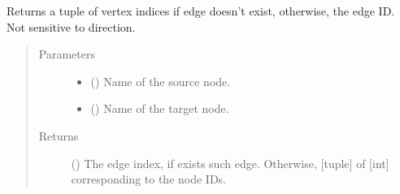 \documentclass[letterpaper,10pt,english]{sphinxmanual}
\begin{document}
\begin{fulllineitems}
\begin{fulllineitems}
\end{fulllineitems}


\begin{fulllineitems}
\label{\detokenize{main:pypath.main.PyPath.dvs}}
\end{fulllineitems}


\begin{fulllineitems}
\label{\detokenize{main:pypath.main.PyPath.edge_exists}}
Returns a tuple of vertex indices if edge doesn’t exist,
otherwise, the edge ID. Not sensitive to direction.
\begin{quote}\begin{description}
\item[{Parameters}] \leavevmode\begin{itemize}
\item {} 
 () \textendash{} Name of the source node.

\item {} 
 () \textendash{} Name of the target node.

\end{itemize}

\item[{Returns}] \leavevmode
() \textendash{} The edge index, if exists such edge. Otherwise,
{[}tuple{]} of {[}int{]} corresponding to the node IDs.

\end{description}\end{quote}

\end{fulllineitems}


\begin{fulllineitems}
\label{\detokenize{main:pypath.main.PyPath.edge_loc}}
\end{fulllineitems}


\end{fulllineitems}
\end{document}
